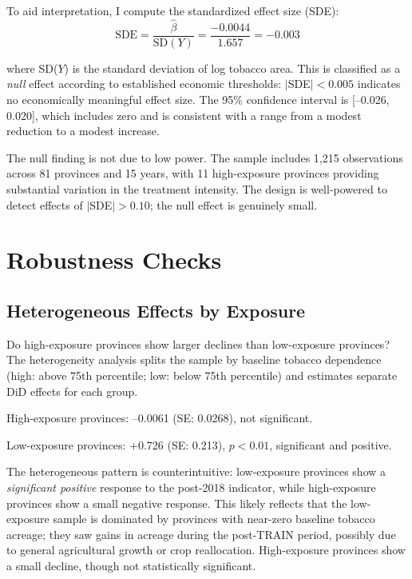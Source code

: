 \documentclass[12pt]{article}
\begin{document}
To aid interpretation, I compute the standardized effect size (SDE):
\begin{equation}
\text{SDE} = \frac{\hat{\beta}}{\text{SD}(Y)} = \frac{-0.0044}{1.657} = -0.003
\end{equation}

where SD($Y$) is the standard deviation of log tobacco area. This is classified as a \emph{null} effect according to established economic thresholds: $|$SDE$| < 0.005$ indicates no economically meaningful effect size. The 95\% confidence interval is [--0.026, 0.020], which includes zero and is consistent with a range from a modest reduction to a modest increase.

The null finding is not due to low power. The sample includes 1,215 observations across 81 provinces and 15 years, with 11 high-exposure provinces providing substantial variation in the treatment intensity. The design is well-powered to detect effects of $|$SDE$| > 0.10$; the null effect is genuinely small.

\section{Robustness Checks} \label{sec:robustness}

\subsection{Heterogeneous Effects by Exposure}

Do high-exposure provinces show larger declines than low-exposure provinces? The heterogeneity analysis splits the sample by baseline tobacco dependence (high: above 75th percentile; low: below 75th percentile) and estimates separate DiD effects for each group.

High-exposure provinces: --0.0061 (SE: 0.0268), not significant.

Low-exposure provinces: +0.726 (SE: 0.213), $p < 0.01$, significant and positive.

The heterogeneous pattern is counterintuitive: low-exposure provinces show a \emph{significant positive} response to the post-2018 indicator, while high-exposure provinces show a small negative response. This likely reflects that the low-exposure sample is dominated by provinces with near-zero baseline tobacco acreage; they saw gains in acreage during the post-TRAIN period, possibly due to general agricultural growth or crop reallocation. High-exposure provinces show a small decline, though not statistically significant.
\end{document}
